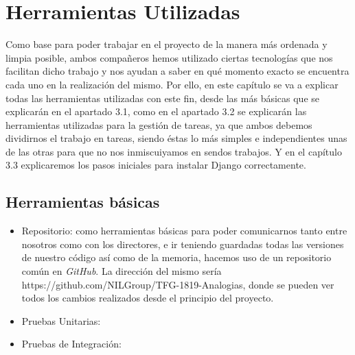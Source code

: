 \chapter{Herramientas Utilizadas}
\label{cap:herramientas}

Como base para poder trabajar en el proyecto de la manera más ordenada y limpia posible, ambos compañeros hemos utilizado ciertas tecnologías que nos facilitan dicho trabajo y nos ayudan a saber en qué momento exacto se encuentra cada uno en la realización del mismo.
Por ello, en este capítulo se va a explicar todas las herramientas utilizadas con este fin, desde las más básicas que se explicarán en el apartado 3.1, como en el apartado 3.2 se explicarán las herramientas utilizadas para la gestión de tareas, ya que ambos debemos dividirnos el trabajo en tareas, siendo éstas lo más simples e independientes unas de las otras para que no nos inmiscuiyamos en sendos trabajos. Y en el capítulo 3.3 explicaremos los pasos iniciales para instalar Django correctamente.


\section{Herramientas básicas}
\label{cap:sec:herramientasBasicas}
	
	\begin{itemize}
	\item Repositorio: como herramientas básicas para poder comunicarnos tanto entre nosotros como con los directores, e ir teniendo  guardadas todas las versiones de nuestro código así como de la memoria, hacemos uso de un repositorio común en \textit{GitHub}. 
	La dirección del mismo sería https://github.com/NILGroup/TFG-1819-Analogias, donde se pueden ver todos los cambios realizados desde el principio del proyecto.

	\item Pruebas Unitarias: 
	\item Pruebas de Integración: 
	\end{itemize}

